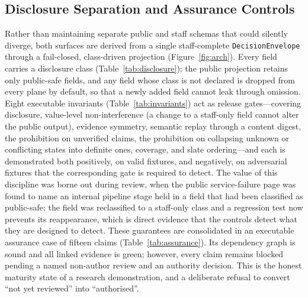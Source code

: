\subsection{Disclosure Separation and Assurance Controls}
\label{sec:disclosure}
Rather than maintaining separate public and staff schemas that could silently diverge, both surfaces are
derived from a single staff-complete \texttt{DecisionEnvelope} through a fail-closed, class-driven
projection (Figure~\ref{fig:arch}). Every field carries a disclosure class (Table~\ref{tab:disclosure});
the public projection retains only public-safe fields, and any field whose class is not declared is
dropped from every plane by default, so that a newly added field cannot leak through omission. Eight
executable invariants (Table~\ref{tab:invariants}) act as release gates---covering disclosure, value-level
non-interference (a change to a staff-only field cannot alter the public output), evidence symmetry,
semantic replay through a content digest, the prohibition on unverified claims, the prohibition on
collapsing unknown or conflicting states into definite ones, coverage, and slate ordering---and each is
demonstrated both positively, on valid fixtures, and negatively, on adversarial fixtures that the
corresponding gate is required to detect. The value of this discipline was borne out during review, when
the public service-failure page was found to name an internal pipeline stage held in a field that had been
classified as public-safe; the field was reclassified to a staff-only class and a regression test now
prevents its reappearance, which is direct evidence that the controls detect what they are designed to
detect. These guarantees are consolidated in an executable assurance case of fifteen claims
(Table~\ref{tab:assurance}). Its dependency graph is sound and all linked evidence is green; however,
every claim remains blocked pending a named non-author review and an authority decision. This is the
honest maturity state of a research demonstration, and a deliberate refusal to convert ``not yet
reviewed'' into ``authorised''.

